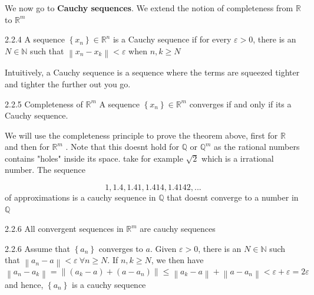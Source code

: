 \documentclass[a4paper,norsk]{article}
\renewcommand{\geq}{\geqslant}
\renewcommand{\leq}{\leqslant}
\renewcommand{\epsilon}{\varepsilon}
\begin{document}
We now go to \textbf{Cauchy sequences}. We extend the notion of completeness from $ \mathbb{R}   $ to $ \mathbb{R}^m $ 


\begin{definitionbox}{2.2.4}{}
A sequence $ \left\{ x_n \right\}  \in \mathbb{R}^n $ is a Cauchy sequence if for every $ \epsilon >0 $, there is an $ N \in \mathbb{N} $  such that $ \left\lVert x_n - x_k \right\rVert < \epsilon  $ when $ n, k\geq N $ 
\end{definitionbox}

Intuitively, a Cauchy sequence is a sequence where the terms are squeezed tighter and tighter the further out you go. 

\begin{theorembox}{2.2.5}{}
Completeness of $ \mathbb{R}^m $ 
A sequence $ \left\{ x_n \right\} \in \mathbb{R}^m  $ converges if and only if its a Cauchy sequence.
\end{theorembox}


We will use the completeness principle to prove the theorem above, first for $ \mathbb{R} $ and then for $ \mathbb{R}^m $  . Note that this doesnt hold for $ \mathbb{Q} $ or $ \mathbb{Q}^m $  as the rational numbers contains "holes" inside its space. take for example $ \sqrt{ 2 } $ which is a irrational number. The sequence

\[
    1, 1.4, 1.41, 1.414, 1.4142, ...
\]
of approximations is a cauchy sequence in $ \mathbb{Q} $ that doesnt converge to a number in $ \mathbb{Q} $


\begin{propositionbox}{2.2.6}{}
All convergent sequences in $ \mathbb{R}^m $ are cauchy sequences

\begin{proofbox}{2.2.6}{}
  Assume that $ \left\{ a_n \right\}  $ converges to $ a $. Given $ \epsilon > 0 $, there is an $ N \in \mathbb{N} $ such that $ \left\lVert a_n - a \right\rVert < \epsilon \: \forall n \geq N $. If $ n, k \geq N $, we then have
  \[
      \left\lVert a_n - a_k \right\rVert = \left\lVert \left( a_k - a \right) + \left( a - a_n \right)  \right\rVert \leq \left\lVert a_k - a \right\rVert  + \left\lVert a - a_n \right\rVert < \epsilon + \epsilon = 2 \epsilon 
  \]
  and hence, $ \left\{ a_n \right\}  $ is a cauchy sequence
  
\end{proofbox}
\end{propositionbox}
\end{document}
